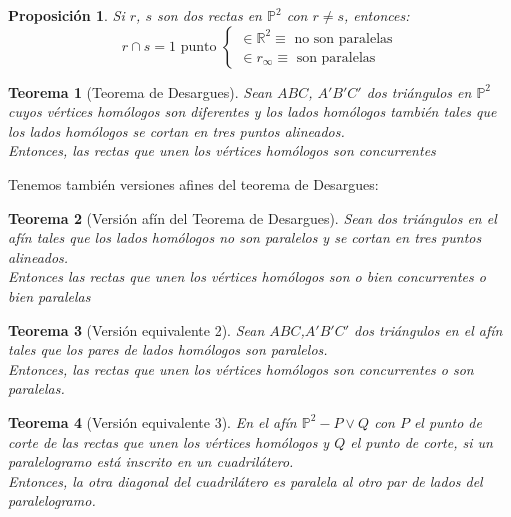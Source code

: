 \documentclass[11pt, a4paper]{article}
\newif\IfInSansMode
\newcommand{\R}{\mathbb{R}}
\theoremstyle{theorem-style}
\newtheorem{nth}{Teorema}[section]
\newtheorem{nprop}{Proposición}[section]
\theoremstyle{definition-style}
\theoremstyle{remark-style}
\theoremstyle{example-style}
\begin{document}
\begin{nprop}
	Si $r$, $s$ son dos rectas en $\mathbb P^2$ con $r\ne s$, entonces:
	\[
	r \cap s = 1 \text { punto } \begin{cases}
	\in \R^2 \equiv \text{ no son paralelas}\\

	\in r_\infty \equiv \text{ son paralelas}
	
\end{cases}
	\]
\end{nprop}

\begin{nth}[Teorema de Desargues]
	Sean $ABC$, $A'B'C'$ dos triángulos en $\mathbb P^2$ cuyos vértices homólogos son diferentes y los lados homólogos también tales que los lados homólogos se cortan en tres puntos alineados.\\
	Entonces, las rectas que unen los vértices homólogos son concurrentes
\end{nth}

Tenemos también versiones afines del teorema de Desargues:

\begin{nth}[Versión afín del Teorema de Desargues]
	Sean dos triángulos en el afín tales que los lados homólogos no son paralelos y se cortan en tres puntos alineados.\\
	  Entonces las rectas que unen los vértices homólogos son o bien concurrentes o bien paralelas
\end{nth}

\begin{nth}[Versión equivalente 2]
	Sean $ABC$,$A'B'C'$ dos triángulos en el afín tales que los pares de lados homólogos son paralelos.\\
	Entonces, las rectas que unen los vértices homólogos son concurrentes o son paralelas.
\end{nth}


\begin{nth}[Versión equivalente 3]
	En el afín $\mathbb P^2 - P\vee Q$ con $P$ el punto de corte de las rectas que unen los vértices homólogos y $Q$  el punto de corte, si un paralelogramo está inscrito en un cuadrilátero.\\
	Entonces, la otra diagonal del cuadrilátero es paralela al otro par de lados del paralelogramo.
\end{nth}
\end{document}

